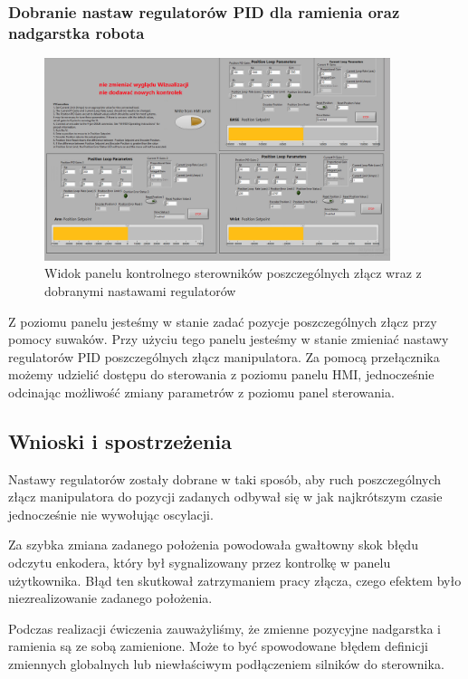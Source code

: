 \documentclass[margin = 2cm]{article}
\begin{document}
		\subsubsection{Dobranie nastaw regulatorów PID dla ramienia oraz nadgarstka robota}
	\begin{figure}[H]
		\centering
		\includegraphics[width=0.9\textwidth]{3_panel}
		\caption{Widok panelu kontrolnego sterowników poszczególnych złącz wraz z dobranymi nastawami regulatorów}
	\end{figure}
Z poziomu panelu jesteśmy w stanie zadać pozycje poszczególnych złącz przy pomocy suwaków. Przy użyciu tego panelu jesteśmy w stanie zmieniać nastawy regulatorów PID poszczególnych złącz manipulatora. Za pomocą przełącznika możemy udzielić dostępu do sterowania z poziomu panelu HMI, jednocześnie odcinając możliwość zmiany parametrów z poziomu panel sterowania.
	\subsection{Wnioski i spostrzeżenia}
Nastawy regulatorów zostały dobrane w taki sposób, aby ruch poszczególnych złącz manipulatora do pozycji zadanych odbywał się w jak najkrótszym czasie jednocześnie nie wywołując oscylacji. 

Za szybka zmiana zadanego położenia powodowała gwałtowny skok błędu odczytu enkodera, który był sygnalizowany przez kontrolkę w panelu użytkownika. Błąd ten skutkował zatrzymaniem pracy złącza, czego efektem było niezrealizowanie zadanego położenia.

Podczas realizacji ćwiczenia zauważyliśmy, że zmienne pozycyjne nadgarstka i ramienia są ze sobą zamienione. Może to być spowodowane błędem definicji zmiennych globalnych lub niewłaściwym podłączeniem silników do sterownika.
\end{document}
